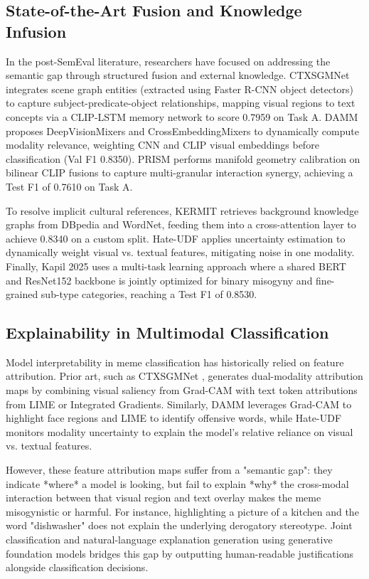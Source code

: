 \documentclass[11pt]{article}
\begin{document}
\subsection{State-of-the-Art Fusion and Knowledge Infusion}
In the post-SemEval literature, researchers have focused on addressing the semantic gap through structured fusion and external knowledge. CTXSGMNet \cite{kumari2024unintended} integrates scene graph entities (extracted using Faster R-CNN object detectors) to capture subject-predicate-object relationships, mapping visual regions to text concepts via a CLIP-LSTM memory network to score 0.7959 on Task A. DAMM \cite{imam2026damm} proposes DeepVisionMixers and CrossEmbeddingMixers to dynamically compute modality relevance, weighting CNN and CLIP visual embeddings before classification (Val F1 0.8350). PRISM \cite{zhu2026prism} performs manifold geometry calibration on bilinear CLIP fusions to capture multi-granular interaction synergy, achieving a Test F1 of 0.7610 on Task A.

To resolve implicit cultural references, KERMIT \cite{grasso2024kermit} retrieves background knowledge graphs from DBpedia and WordNet, feeding them into a cross-attention layer to achieve 0.8340 on a custom split. Hate-UDF \cite{lei2025hateudf} applies uncertainty estimation to dynamically weight visual vs. textual features, mitigating noise in one modality. Finally, Kapil 2025 \cite{kapil2025transformer} uses a multi-task learning approach where a shared BERT and ResNet152 backbone is jointly optimized for binary misogyny and fine-grained sub-type categories, reaching a Test F1 of 0.8530.

\subsection{Explainability in Multimodal Classification}
Model interpretability in meme classification has historically relied on feature attribution. Prior art, such as CTXSGMNet \cite{kumari2024unintended}, generates dual-modality attribution maps by combining visual saliency from Grad-CAM with text token attributions from LIME or Integrated Gradients. Similarly, DAMM \cite{imam2026damm} leverages Grad-CAM to highlight face regions and LIME to identify offensive words, while Hate-UDF \cite{lei2025hateudf} monitors modality uncertainty to explain the model's relative reliance on visual vs. textual features.

However, these feature attribution maps suffer from a "semantic gap": they indicate *where* a model is looking, but fail to explain *why* the cross-modal interaction between that visual region and text overlay makes the meme misogynistic or harmful. For instance, highlighting a picture of a kitchen and the word "dishwasher" does not explain the underlying derogatory stereotype. Joint classification and natural-language explanation generation using generative foundation models bridges this gap by outputting human-readable justifications alongside classification decisions.
\end{document}

